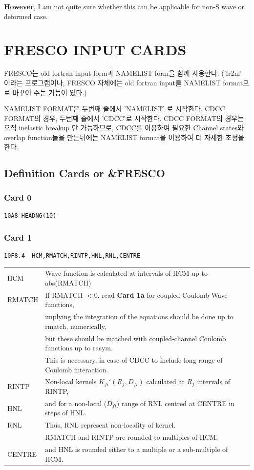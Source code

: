 \documentclass[11pt]{book}
\begin{document}
{\bf However}, I am not quite sure whether this can be applicable for 
non-S wave or deformed case.  

\chapter{FRESCO INPUT CARDS}
FRESCO는 old fortran input form과 NAMELIST form을 함께 사용한다. 
('fr2nl' 이라는 프로그램이나, FRESCO 자체에는 old fortran input을 NAMELIST format으로 
바꾸어 주는 기능이 있다.)

NAMELIST FORMAT은 두번째 줄에서 'NAMELIST' 로 시작한다. 
CDCC FORMAT의 경우, 두번째 줄에서 'CDCC'로 시작한다. CDCC FORMAT의 경우는
오직 inelastic breakup 만 가능하므로, CDCC를 이용하여 필요한 Channel states와 
overlap function들을 만든뒤에는 NAMELIST format을 이용하여 
더 자세한 조정을 한다. 

\section{Definition Cards or \&FRESCO }
\subsection{Card 0}
\begin{verbatim}
10A8 HEADNG(10)
\end{verbatim} 

\subsection{Card 1}
\begin{verbatim}
10F8.4  HCM,RMATCH,RINTP,HNL,RNL,CENTRE
\end{verbatim}

\begin{table}[h] 
\begin{tabular}{|l|l|}
\hline 
HCM & Wave function is calculated at intervals of HCM  up to abs(RMATCH)\\ 
RMATCH &  If RMATCH $<0$, read {\bf Card 1a} for coupled Coulomb Wave functions,   \\ 
      &   implying the integration of the equations should be done up to rmatch, numerically,   \\
      &   but these should be matched with coupled-channel Coulomb functions up to 
          rasym. \\ 
      &   This is necessary, in case of CDCC to include long range of Coulomb interaction. \\    \hline 
RINTP & Non-local kernels $K_{fi}'(R_{f},D_{fi})$ calculated at $R_f$ intervals of RINTP,
\\ 
HNL & and for a non-local ($D_{fi}$) range of RNL centred at CENTRE in steps of HNL. \\ 
RNL & Thus, RNL represent non-locality of kernel.\\
    &  RMATCH and RINTP are rounded to multiples of HCM, \\ 
CENTRE & and HNL is rounded either to a multiple or a sub-multiple of HCM.    \\ \hline 
\end{tabular} 
\end{table} 
\end{document}
